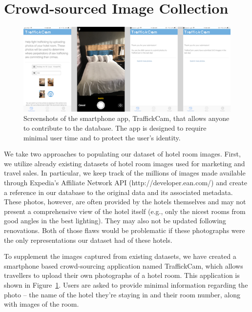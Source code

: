 \section{Crowd-sourced Image Collection}
\begin{figure}[ht!]
  \begin{center}
    \includegraphics[width=\textwidth]{figures/chapter2/appScreenshots.png}
  \end{center}
  \caption[Smartphone app screenshots.]{Screenshots of the smartphone app, TraffickCam, that allows anyone to contribute to the database. The app is designed to require minimal user time and to protect the user's identity.}
  \label{fig:appScreenshots}
\end{figure}

We take two approaches to populating our dataset of hotel room images. First, we utilize already existing datasets of hotel room images used for marketing and travel sales. In particular, we keep track of the millions of images made available through Expedia’s Affiliate Network API (http://developer.ean.com/) and create a reference in our database to the original data and its associated metadata. These photos, however, are often provided by the hotels themselves and may not present a comprehensive view of the hotel itself (e.g., only the nicest rooms from good angles in the best lighting). They may also not be updated following renovations. Both of those flaws would be problematic if these photographs were the only representations our dataset had of these hotels. 

To supplement the images captured from existing datasets, we have created a smartphone based crowd-sourcing application named TraffickCam, which allows travellers to upload their own photographs of a hotel room. This application is shown in Figure~\ref{fig:appScreenshots}. Users are asked to provide minimal information regarding the photo -- the name of the hotel they're staying in and their room number, along with images of the room.

